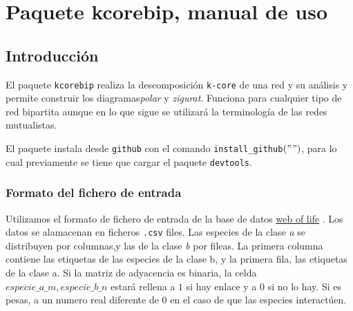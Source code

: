 
\appendix
\renewcommand{\thechapter}{B}
\chapter{Paquete kcorebip, manual de uso} %

\label{APP_KCOREMANBIP} %

\section*{Introducción}

El paquete \texttt{kcorebip} realiza la descomposición \texttt{k-core} de una red y su análisis y permite construir los diagramas\textit{polar}
y \textit{zigurat}. Funciona para cualquier tipo de red bipartita aunque en lo que sigue se utilizará la terminología de las redes mutualistas.

El paquete instala desde \texttt{github} con el comando \texttt{install\_github}$("$$")$, para lo cual previamente se tiene que cargar el paquete \texttt{devtools}.
 
\subsection*{Formato del fichero de entrada}
\label{input_file_format}

Utilizamos el formato de fichero de entrada de la base de datos \href{http://www.web-of-life.es/}{web of life} \cite{bascompte2009}. Los datos se alamacenan en ficheros \texttt{.csv} files. Las especies de la clase \textit{a} se distribuyen por columnas,y las de la clase \textit{b} por fileas. La primera columna contiene las etiquetas de las especies de la clase b, y la primera fila, las etiquetas de la clase a. Si la matriz de adyacencia es binaria, la celda $especie\_a\_m,especie\_b\_n$ estará rellena a $1$ si hay enlace y a $0$ si no lo hay. Si es pesas, a un numero real diferente de $0$ en el caso de que las especies interactúen.

